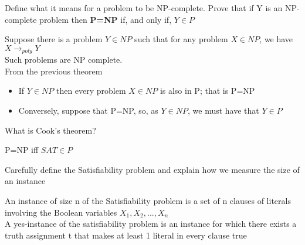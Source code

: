 \documentclass[addpoints]{exam}
\begin{document}
\begin{questions}
\question[6]Define what it means for a problem to be NP-complete. Prove that if Y is an NP-complete problem then \textbf{P=NP} if, and only if, $Y\in P$
\begin{solution}[2in]
	Suppose there is a problem $Y\in NP$ such that for any problem $X\in NP$, we have $X\rightarrow_{poly} Y$\\
	Such problems are NP complete.\\
	From the previous theorem
	\begin{itemize}
		\item If $Y\in NP$ then every problem $X\in NP$ is also in P; that is P=NP
		\item Conversely, suppose that P=NP, so, as $Y\in NP$, we must have that $Y\in P$
	\end{itemize}
	 
\end{solution}

\question[2]What is Cook's theorem?
\begin{solution}[2in]
	P=NP iff $SAT\in P$
\end{solution}

\question[4]Carefully define the Satisfiability problem and explain how we measure the size of an instance
\begin{solution}[2in]
	An instance of size n of the Satisfiability problem is a set of n clauses of literals involving the Boolean variables $X_1,X_2,...,X_n$\\
	A yes-instance of the satisfiability problem is an instance for which there exists a truth assignment t that makes at least 1 literal in every clause true  
\end{solution}	
\end{questions}
	
\end{document}
